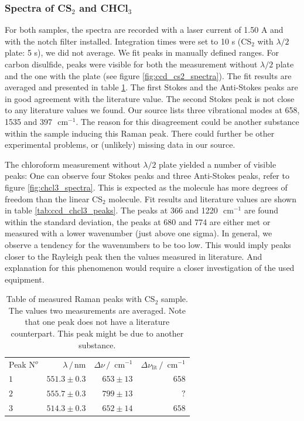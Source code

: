 \subsubsection{Spectra of CS$_2$ and CHCl$_3$}
For both samples, the spectra are recorded with a laser current of 1.50 A and with the notch filter installed. 
Integration times were set to 10 s (CS$_2$ with $\lambda / 2$ plate: 5 s), we did not average. We fit peaks in
manually defined ranges. For carbon disulfide, peaks were visible for both the measurement without $\lambda / 2$ 
plate and the one with the plate (see figure \ref{fig:ccd_cs2_spectra}). The fit results are averaged and presented 
in table \ref{tab:ccd_cs2_peaks}. The first Stokes and the Anti-Stokes peaks are in good agreement with the 
literature value. The second Stokes peak is not close to any literature values we found. Our source lists three
vibrational modes at 658, 1535 and 397 $\text{ cm}^{-1}$. The reason for this disagreement could be another 
substance within the sample inducing this Raman peak. There could further be other experimental problems, or
(unlikely) missing data in our source. 

The chloroform measurement without $\lambda / 2$ plate yielded a number of visible peaks: One can observe 
four Stokes peaks and three Anti-Stokes peaks, refer to figure \ref{fig:chcl3_spectra}. This is expected
as the molecule has more degrees of freedom than the linear CS$_2$ molecule. Fit results and literature 
values are shown in table \ref{tab:ccd_chcl3_peaks}. The peaks at 366 and 1220 $\text{ cm}^{-1} $ are
found within the standard deviation, the peaks at 680 and 774 are either met or measured with a lower wavenumber
(just above one sigma). In general, we observe a tendency for the wavenumbers to be too low. This would imply
peaks closer to the Rayleigh peak then the values measured in literature. And explanation for this phenomenon 
would require a closer investigation of the used equipment. 
\begin{table}[htpb]
    \centering
    \caption{
        Table of measured Raman peaks with CS$_2$ sample. The values two measurements are averaged. 
        Note that one peak does not have a literature counterpart. This peak might be due to another 
        substance. 
        }
    \label{tab:ccd_cs2_peaks}
    \begin{tabular}{l r r r}
        \rowcolor{LightCyan} Peak N$^o$ & $\lambda \, / \, \text{nm}$ &
        $\Delta \nu \, / \, \text{ cm}^{-1}$ & 
        $\Delta \nu_\text{lit} \, / \, \text{ cm}^{-1}$ \\
        \cellcolor{LightCyan}$1$ & $551.3 \pm 0.3$ & $653 \pm 13$ & $658$   \\
        \cellcolor{LightCyan}$2$ & $555.7 \pm 0.3$ & $799 \pm 13$ & $?$   \\
        \cellcolor{LightCyan}$3$ & $514.3 \pm 0.3$ & $652 \pm 14$ & $658$   
    \end{tabular}
\end{table}

